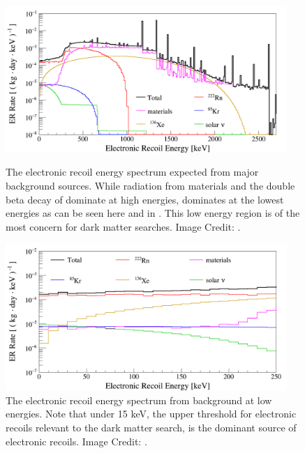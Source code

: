 \begin{figure}[p]
	\centering
	\includegraphics[width=0.95\textwidth]{xe1t_all_energy_er_bkg}
	\caption{The electronic recoil energy spectrum expected from major background sources.  While radiation from materials and the double beta decay of  dominate at high energies,  dominates at the lowest energies as can be seen here and in .  This low energy region is of the most concern for dark matter searches.  Image Credit: .}
	\label{fig:xe1t_er_bkg_all}

        \vspace{\floatsep}

	\centering
	\includegraphics[width=0.95\textwidth]{xe1t_low_energy_er_bkg}
	\caption{The electronic recoil energy spectrum from background at low energies.  Note that under 15 keV, the upper threshold for electronic recoils relevant to the dark matter search, \radon{} is the dominant source of electronic recoils.  Image Credit: .}
	\label{fig:xe1t_er_bkg_low}
\end{figure}


\subsubsection{}
\label{sec:xe1t_er_rn222}

